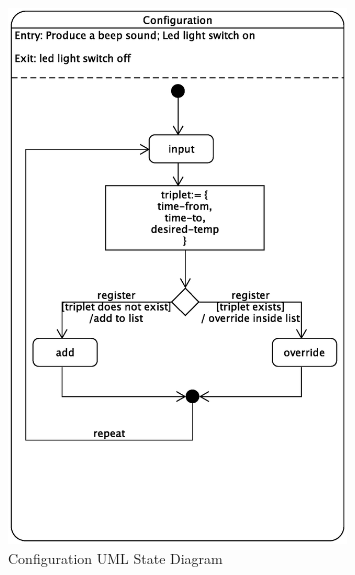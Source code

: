 \documentclass[12pt]{article}
\begin{document}
\begin{spacing}{1.5}
\begin{figure}[h!]
	\centering
		\includegraphics[trim ={0 200pt 0 200pt }, width=0.8\textwidth]{./figures/eps/configurationEFSM.eps}
		  \caption{Configuration UML State Diagram}
  \label{fig:configuration-fig}
\end{figure}

\end{spacing}
\end{document}
